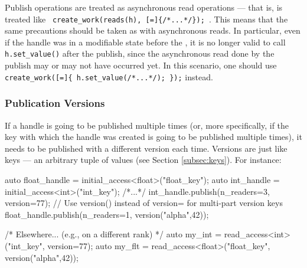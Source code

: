 Publish operations are treated as asynchronous read operations --- that is,
 is treated like
\verb| create_work(reads(h), [=]{/*...*/}); |. 
This means that the same precautions should be taken as with asynchronous reads. 
In particular, even if the handle was in a modifiable state before the 
, it is no
longer valid to call \lstinline!h.set_value()! after the publish, since the
asynchronous read done by the publish may or may not have occurred yet.  In this
scenario, one should use \verb|create_work([=]{ h.set_value(/*...*/); });|
instead.



\subsubsection{Publication Versions}

If a handle is going to be published multiple times (or, more specifically, if
the key with which the handle was created is going to be published multiple
times), it needs to be published with a different version each time.  Versions
are just like keys --- an arbitrary tuple of values (see Section
\ref{subsec:keys}).  For instance:

\begin{CppCode}
auto float_handle = initial_access<float>("float_key");
auto int_handle = initial_access<int>("int_key");
/*...*/
int_handle.publish(n_readers=3, version=77);
// Use version() instead of version= for multi-part version keys
float_handle.publish(n_readers=1, version("alpha",42));

/* Elsewhere... (e.g., on a different rank) */
auto my_int = read_access<int>("int_key", version=77);
auto my_flt = read_access<float>("float_key", version("alpha",42));

\end{CppCode}


